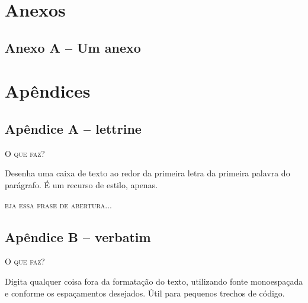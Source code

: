 \thispagestyle{empty}
\part*{Anexos} %
\chapter*{Anexo A -- Um anexo}


\thispagestyle{empty}
\part*{Apêndices} %
\chapter*{Apêndice A -- lettrine}

\noindent\textsc{O que faz?}

Desenha uma caixa de texto ao redor da primeira letra da primeira palavra do parágrafo. É um recurso de estilo, apenas.

\lettrine[findent=2pt]{}{eja essa frase de abertura...} \lipsum[1]

\chapter*{Apêndice B -- verbatim}

\noindent\textsc{O que faz?}

Digita qualquer coisa fora da formatação do texto, utilizando fonte monoespaçada e conforme os espaçamentos desejados. Útil para pequenos trechos de código.

